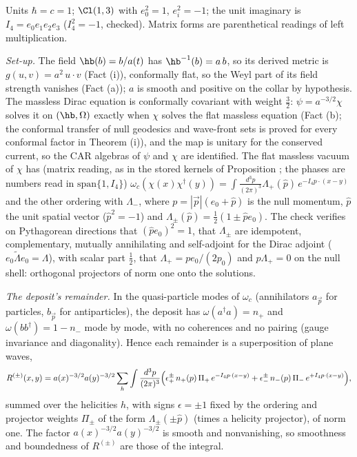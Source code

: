 Units $\hbar = c = 1$; $\Cl(1,3)$ with $e_{0}^{2} = 1$, $e_{i}^{2} = -1$; the unit imaginary is $I_{4} = e_{0}e_{1}e_{2}e_{3}$ ($I_{4}^{2} = -1$, checked). Matrix forms are parenthetical readings of left multiplication.

\emph{Set-up.} The field $\hb(b) = b/a(t)$ has $\hb^{-1}(b) = a\,b$, so its derived metric is $g(u, v) = a^{2}\,u\cdot v$ (Fact (i)), conformally flat, so the Weyl part of its field strength vanishes (Fact (a)); $a$ is smooth and positive on the collar by hypothesis. The massless Dirac equation is conformally covariant with weight $\tfrac32$: $\psi = a^{-3/2}\chi$ solves it on $(\hb, \Omega)$ exactly when $\chi$ solves the flat massless equation (Fact (b); the conformal transfer of null geodesics and wave-front sets is proved for every conformal factor in Theorem (i)), and the map is unitary for the conserved current, so the CAR algebras of $\psi$ and $\chi$ are identified. The flat massless vacuum of $\chi$ has (matrix reading, as in the stored kernels of Proposition ; the phases are numbers read in $\mathrm{span}\{1, I_{4}\}$) $\omega_{c}(\chi(x)\chi^{\dagger}(y)) = \int\frac{d^{3}p}{(2\pi)^{3}}\Lambda_{+}(\hat p)\,e^{-I_{4}p\cdot(x - y)}$ and the other ordering with $\Lambda_{-}$, where $p = |\vec p|(e_{0} + \hat p)$ is the null momentum, $\hat p$ the unit spatial vector ($\hat p^{2} = -1$) and $\Lambda_{\pm}(\hat p) = \tfrac12(1 \pm \hat p e_{0})$. The check verifies on Pythagorean directions that $(\hat p e_{0})^{2} = 1$, that $\Lambda_{\pm}$ are idempotent, complementary, mutually annihilating and self-adjoint for the Dirac adjoint ($e_{0}\tilde\Lambda e_{0} = \Lambda$), with scalar part $\tfrac12$, that $\Lambda_{+} = pe_{0}/(2p_{0})$ and $p\Lambda_{+} = 0$ on the null shell: orthogonal projectors of norm one onto the solutions.

\emph{The deposit's remainder.} In the quasi-particle modes of $\omega_{c}$ (annihilators $a_{\vec p}$ for particles, $b_{\vec p}$ for antiparticles), the deposit has $\omega(a^{\dagger}a) = n_{+}$ and $\omega(bb^{\dagger}) = 1 - n_{-}$ mode by mode, with no coherences and no pairing (gauge invariance and diagonality). Hence each remainder is a superposition of plane waves,
\[
R^{(\pm)}(x, y) = a(x)^{-3/2}a(y)^{-3/2}\sum_{h}\int\frac{d^{3}p}{(2\pi)^{3}}\Bigl(\epsilon^{\pm}_{+}\,n_{+}(p)\,\Pi_{+}\,e^{-I_{4}p\cdot(x - y)} + \epsilon^{\pm}_{-}\,n_{-}(p)\,\Pi_{-}\,e^{+I_{4}p\cdot(x - y)}\Bigr),
\]
summed over the helicities $h$, with signs $\epsilon = \pm 1$ fixed by the ordering and projector weights $\Pi_{\pm}$ of the form $\Lambda_{\pm}(\pm\hat p)$ (times a helicity projector), of norm one. The factor $a(x)^{-3/2}a(y)^{-3/2}$ is smooth and nonvanishing, so smoothness and boundedness of $R^{(\pm)}$ are those of the integral.

